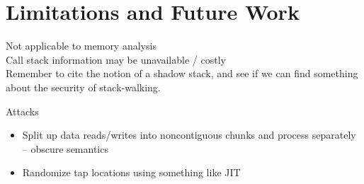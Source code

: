 \section{Limitations and Future Work}
\label{sec:limitations}

Not applicable to memory analysis \\

\noindent Call stack information may be unavailable / costly \\

Remember to cite the notion of a shadow stack, and see if we can find
something about the security of stack-walking.

\noindent
Attacks

\begin{itemize}
\item Split up data reads/writes into noncontiguous chunks and process separately -- obscure semantics
\item Randomize tap locations using something like JIT
\end{itemize}

